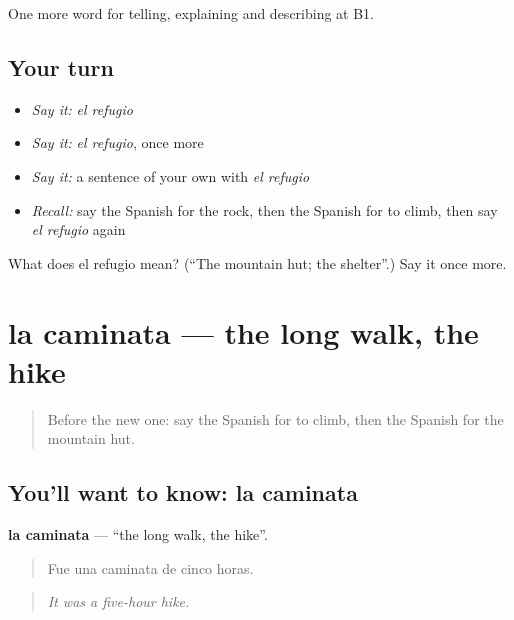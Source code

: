 \begin{grammarlens}[title={What you've built}]
One more word for telling, explaining and describing at B1.
\end{grammarlens}

\subsection*{Your turn}
\begin{itemize}
\raggedright
  \item \emph{Say it:} \emph{el refugio}
  \item \emph{Say it:} \emph{el refugio}, once more
  \item \emph{Say it:} a sentence of your own with \emph{el refugio}
  \item \emph{Recall:} say the Spanish for the rock, then the Spanish for to climb, then say \emph{el refugio} again
\end{itemize}

\begin{tcolorbox}[breakable,colback=teal!4,colframe=teal!35!black,title={Before you move on}]
What does el refugio mean? (\textquotedblleft{}The mountain hut; the shelter\textquotedblright{}.) Say it once more.
\end{tcolorbox}
\section[la caminata]{la caminata — the long walk, the hike}

\label{lesson:ES-C687-caminata}



\begin{quote}
Before the new one: say the Spanish for to climb, then the Spanish for the mountain hut.
\end{quote}

\subsection*{You'll want to know: la caminata}
\textbf{la caminata} — \textquotedblleft{}the long walk, the hike\textquotedblright{}.

\begin{quote}
Fue una caminata de cinco horas.
\end{quote}

\begin{quote}
\emph{It was a five-hour hike.}
\end{quote}

